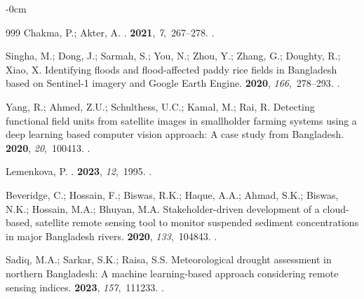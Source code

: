 \documentclass[water,article,accept,pdftex,oneauhor]{Definitions/mdpi}
\begin{document}
{{{\begin{adjustwidth}{-\extralength}{0cm}
\begin{thebibliography}{999}
Chakma, P.; Akter, A.
.
 {\bf 2021}, {\em
  7},~267--278.
.

Singha, M.; Dong, J.; Sarmah, S.; You, N.; Zhou, Y.; Zhang, G.; Doughty, R.;
  Xiao, X.
\newblock Identifying floods and flood-affected paddy rice fields in Bangladesh
  based on Sentinel-1 imagery and Google Earth Engine.
 {\bf 2020}, {\em
  166},~278--293.
.

Yang, R.; Ahmed, Z.U.; Schulthess, U.C.; Kamal, M.; Rai, R.
\newblock Detecting functional field units from satellite images in smallholder
  farming systems using a deep learning based computer vision approach: A case
  study from Bangladesh.
 {\bf 2020}, {\em 20},~100413.
.

Lemenkova, P.
.
 {\bf 2023}, {\em 12},~1995.
.

Beveridge, C.; Hossain, F.; Biswas, R.K.; Haque, A.A.; Ahmad, S.K.; Biswas,
  N.K.; Hossain, M.A.; Bhuyan, M.A.
\newblock Stakeholder-driven development of a cloud-based, satellite remote
  sensing tool to monitor suspended sediment concentrations in major Bangladesh
  rivers.
 {\bf 2020}, {\em 133},~104843.
.

Sadiq, M.A.; Sarkar, S.K.; Raisa, S.S.
\newblock Meteorological drought assessment in northern Bangladesh: A machine
  learning-based approach considering remote sensing indices.
 {\bf 2023}, {\em 157},~111233.
.


\end{thebibliography}
\end{adjustwidth}}}}
\end{document}
